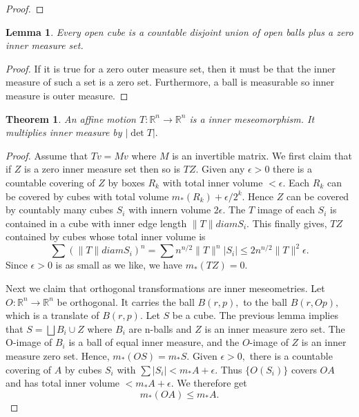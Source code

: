 \documentclass[letter]{article}
\newtheorem{theorem}{Theorem}
\newtheorem{lemma}{Lemma}
\newenvironment{menumerate}{%
  \edef\backupindent{\the\parindent}%
  \enumerate%
  \setlength{\parindent}{\backupindent}%
}{\endenumerate}
\begin{document}
\begin{menumerate}
\begin{proof}
	\end{proof}
	\begin{lemma}
		Every open cube is a countable disjoint union of open balls plus a zero inner measure set.
	\end{lemma}
	\begin{proof}
		If it is true for a zero outer measure set, then it must be that the inner measure of such 
		a set is a zero set. Furthermore, a ball is measurable so inner measure is outer measure.
	\end{proof}
	\begin{theorem}
		An affine motion $T: \mathbb{R}^n \to \mathbb{R}^n$ is a inner meseomorphism. It multiplies inner measure by $|\det T|.$
	\end{theorem}
	\begin{proof}
		Assume that $Tv = Mv$ where $M$ is an invertible matrix. 
		We first claim that if $Z$ is  a zero inner measure set then so is $TZ$. Given any $\epsilon > 0$ there is a countable covering of $Z$ by boxes  $R_k$ with total inner volume $< \epsilon.$ Each $R_k$ can be covered by cubes with total volume $m_*(R_k) + \epsilon/2^k.$ Hence $Z$ can be covered by countably many cubes $S_i$ with innern volume $2\epsilon.$ The $T$ image of each $S_i$ is contained in a cube with inner edge length $\|T\| diam S_i.$ This finally gives, $TZ$ contained by cubes whose total inner volume is
		\begin{equation}
			\sum(\|T\| diam S_i)^n = \sum n^{n/2} \|T\|^n |S_i| \leq 2n^{n/2} \|T\|^2\epsilon.
		\end{equation}
		Since $\epsilon > 0$ is as  small as we like, we have $m_*(TZ) = 0.$

		Next we claim that orthogonal transformations are inner meseometries. Let $O:\mathbb{R}^n \to \mathbb{R}^n$ be orthogonal. It carries the ball $B(r,p),$ to the ball $B(r, Op),$ which is a translate of $B(r,p).$ Let $S$ be a cube. The previous lemma implies that $S = \bigsqcup B_i \cup Z$ where $B_i$ are n-balls and $Z$ is an inner measure zero set. The O-image of $B_i$ is
		a ball of equal inner measure, and the $O$-image of $Z$ is an inner measure zero set. Hence,
		$m_*(OS) = m_*S.$ Given $\epsilon > 0,$ there is a countable covering of $A$ by cubes $S_i$ with $\sum |S_i| < m_*A + \epsilon$. Thus $\{O(S_i)\}$ covers $OA$ and has total inner volume $< m_*A + \epsilon.$ We therefore get
		\begin{equation}
		  	m_*(OA) \leq m_*A.
		  \end{equation}  


\end{proof}
\end{menumerate}
\end{document}
